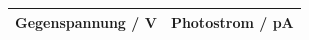 \begin{figure}[h!]
	\centering
	\begin{tabular}{c|c}
		Gegenspannung / V & Photostrom / \si{\pico\ampere}  \\
		\hline
		
	\end{tabular}
	\label{tab:orange}
\end{figure}

	
